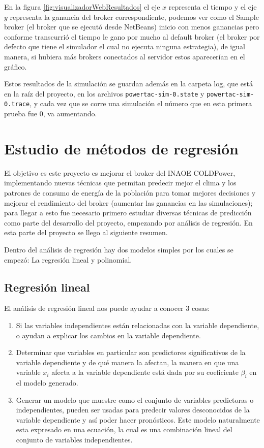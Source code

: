 En la figura \ref{fig:visualizadorWebResultados} el eje $x$ representa el tiempo y el eje $y$ representa la ganancia del broker correspondiente, podemos ver como el Sample broker (el broker que se ejecutó desde NetBeans) inicio con menos ganancias pero conforme
transcurrió el tiempo le gano por mucho al default broker (el broker por defecto que tiene el simulador el cual no ejecuta ninguna estrategia), de igual manera, si hubiera más brokers conectados al servidor estos aparecerían en el gráfico.

Estos resultados de la simulación se guardan además en la carpeta log, que está en la raíz del proyecto, en los archivos \texttt{powertac-sim-0.state} y \texttt{powertac-sim-0.trace}, y cada vez que se corre una simulación el número que en esta primera prueba fue 0, va aumentando.

\section{Estudio de métodos de regresión}
El objetivo es este proyecto es mejorar el broker del INAOE COLDPower, implementando nuevas técnicas que permitan predecir mejor el clima y los patrones de consumo de energía de la población para tomar mejores decisiones y mejorar el rendimiento del broker (aumentar las ganancias en las simulaciones); para llegar a esto fue necesario primero estudiar diversas técnicas de predicción como parte del desarrollo del proyecto, empezando por análisis de regresión. En esta parte del proyecto se llego al siguiente resumen.

Dentro del análisis de regresión hay dos modelos simples por los cuales se
empezó: La regresión lineal y polinomial.

\subsection{Regresión lineal}
El análisis de regresión lineal nos puede ayudar a conocer 3 cosas:

\begin{enumerate}
	\item Si las variables independientes están relacionadas con la variable dependiente, o ayudan a explicar los cambios en la variable dependiente.
	\item Determinar que variables en particular son predictores significativos de la variable dependiente y de qué manera la afectan, la manera en que una variable $x_i$ afecta a la variable dependiente está dada por su coeficiente $\beta_i$ en el modelo generado.
	\item Generar un modelo que muestre como el conjunto de variables predictoras o independientes, pueden ser usadas para predecir valores desconocidos de la variable dependiente y así poder hacer pronósticos. Este modelo naturalmente esta expresado en una ecuación, la cual es una combinación lineal del conjunto de variables independientes.
\end{enumerate}

